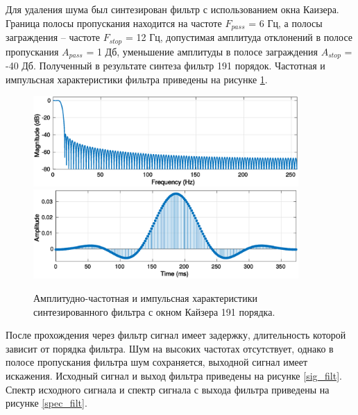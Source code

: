 \documentclass[a4paper,14pt]{extarticle}
\begin{document}
Для удаления шума был синтезирован фильтр с использованием окна Каизера. Граница полосы пропускания находится на частоте $F_{pass}$ = 6 Гц, а полосы заграждения -- частоте $F_{stop}$ = 12 Гц, допустимая амплитуда отклонений в полосе пропускания $A_{pass}$ = 1 Дб, уменьшение амплитуды в полосе заграждения $A_{stop}$ = -40 Дб. Полученный в результате синтеза фильтр 191 порядок. Частотная и импульсная характеристики фильтра приведены на рисунке \ref{mag_res}.

\begin{figure}[H]
\centering
\includegraphics[width=0.9\textwidth]{mag_resp.eps}
\includegraphics[width=0.9\textwidth]{imp_resp.eps}
\captionsetup{justification=centering,margin=0.5cm}
\caption{Амплитудно-частотная и импульсная характеристики синтезированного фильтра с окном Кайзера 191 порядка. }
\label{mag_res}
\end{figure}
%

После прохождения через фильтр сигнал имеет задержку, длительность которой зависит от порядка фильтра. Шум на высоких частотах отсутствует, однако в полосе пропускания фильтра шум сохраняется, выходной сигнал имеет искажения. Исходный сигнал и выход фильтра приведены на рисунке \ref{sig_filt}. Спектр исходного сигнала и спектр сигнала с выхода фильтра приведены на рисунке \ref{spec_filt}. 
\end{document}
